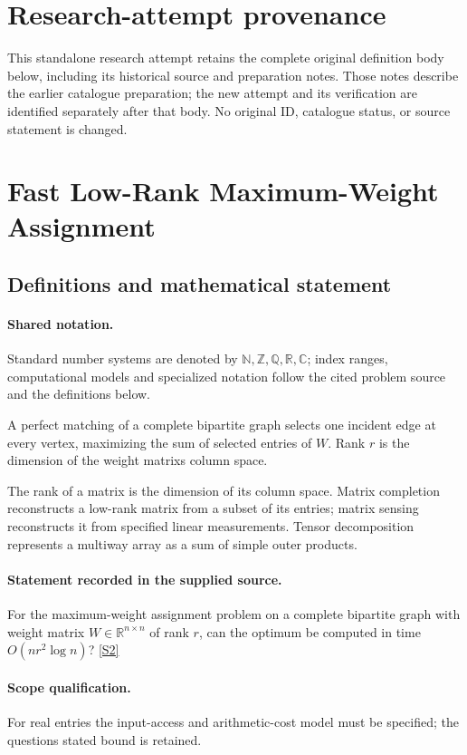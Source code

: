 \documentclass[11pt]{article}
\begin{document}
\section*{Research-attempt provenance}
This standalone research attempt retains the complete original definition body below,
including its historical source and preparation notes. Those notes describe the
earlier catalogue preparation; the new attempt and its verification are identified
separately after that body. No original ID, catalogue status, or source statement is changed.

\section{Fast Low-Rank Maximum-Weight Assignment}\label{statement}

\subsection{Definitions and mathematical statement}

\paragraph{Shared notation.}Standard number systems are denoted by $\mathbb N,\mathbb Z,\mathbb Q,\mathbb R,\mathbb C$; index ranges, computational models and specialized notation follow the cited problem source and the definitions below.


A perfect matching of a complete bipartite graph selects one incident edge at every vertex, maximizing the sum of selected entries of $W$. Rank $r$ is the dimension of the weight matrix\textquotesingle s column space.

The rank of a matrix is the dimension of its column space. Matrix completion reconstructs a low-rank matrix from a subset of its entries; matrix sensing reconstructs it from specified linear measurements. Tensor decomposition represents a multiway array as a sum of simple outer products.
\paragraph{Statement recorded in the supplied source.}
For the maximum-weight assignment problem on a complete bipartite graph with weight matrix $W\in\mathbb R^{n\times n}$ of rank $r$, can the optimum be computed in time $O(nr^2\log n)$? \href{https://doi.org/10.4171/owr/2018/50}{[S2]}
\paragraph{Scope qualification.}
For real entries the input-access and arithmetic-cost model must be specified; the question\textquotesingle s stated bound is retained.
\end{document}
